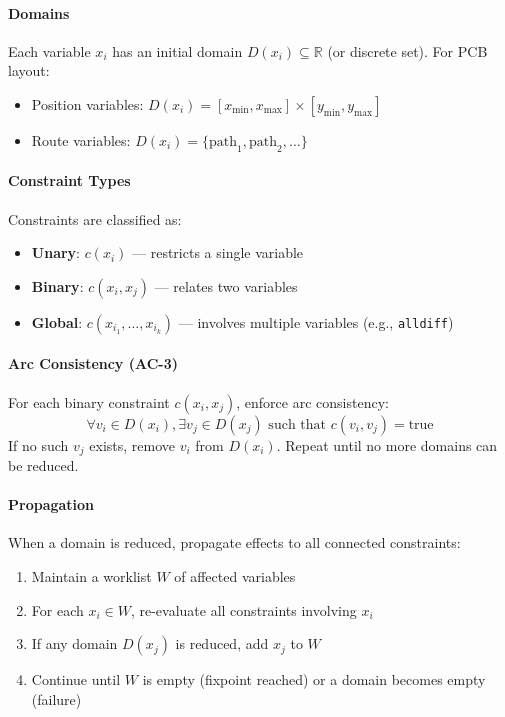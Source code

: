 \documentclass{report}
\begin{document}
\paragraph{Domains}
Each variable $x_i$ has an initial domain $D(x_i) \subseteq \mathbb{R}$ (or discrete set). For PCB layout:
\begin{itemize}
\item Position variables: $D(x_i) = [x_{\min}, x_{\max}] \times [y_{\min}, y_{\max}]$
\item Route variables: $D(x_i) = \{\text{path}_1, \text{path}_2, \ldots\}$
\end{itemize}

\paragraph{Constraint Types}
Constraints are classified as:
\begin{itemize}
\item \textbf{Unary}: $c(x_i)$ --- restricts a single variable
\item \textbf{Binary}: $c(x_i, x_j)$ --- relates two variables
\item \textbf{Global}: $c(x_{i_1}, \ldots, x_{i_k})$ --- involves multiple variables (e.g., \texttt{alldiff})
\end{itemize}

\paragraph{Arc Consistency (AC-3)}
For each binary constraint $c(x_i, x_j)$, enforce arc consistency:
\begin{equation}
\forall v_i \in D(x_i), \exists v_j \in D(x_j) \text{ such that } c(v_i, v_j) = \text{true}
\end{equation}
If no such $v_j$ exists, remove $v_i$ from $D(x_i)$. Repeat until no more domains can be reduced.

\paragraph{Propagation}
When a domain is reduced, propagate effects to all connected constraints:
\begin{enumerate}
\item Maintain a worklist $W$ of affected variables
\item For each $x_i \in W$, re-evaluate all constraints involving $x_i$
\item If any domain $D(x_j)$ is reduced, add $x_j$ to $W$
\item Continue until $W$ is empty (fixpoint reached) or a domain becomes empty (failure)
\end{enumerate}
\end{document}

